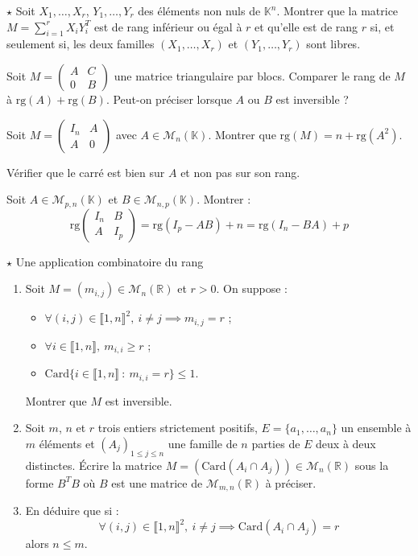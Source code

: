 \documentclass[french,a4paper]{article}
\newcommand{\R}{\mathbb{R}}
\newcommand{\K}{\mathbb{K}}
\newcommand{\card}{\text{Card}}
\theoremstyle{plain}
\theoremstyle{definition}
\theoremstyle{remark}
\begin{document}
\begin{ex}{$\star$}
	Soit $X_1,\ldots,X_r$, $Y_1,\ldots,Y_r$ des éléments non nuls de $\K^n$. Montrer que la matrice $M=\displaystyle\sum_{i=1}^{r}X_iY_i^T$ est de rang inférieur ou égal à $r$ et qu'elle est de rang $r$ si, et seulement si, les deux familles $(X_1,\ldots,X_r)$ et $(Y_1,\ldots,Y_r)$ sont libres.
\end{ex}

\begin{ex}{}
	Soit $M=\displaystyle\begin{pmatrix}
		A&C\\
		0&B
	\end{pmatrix}$ une matrice triangulaire par blocs. Comparer le rang de $M$ à $\text{rg}(A)+\text{rg}(B)$. Peut-on préciser lorsque $A$ ou $B$ est inversible ?
\end{ex}

\begin{ex}{}
		Soit $M=\displaystyle\begin{pmatrix}
		I_n&A\\
		A&0
	\end{pmatrix}$ avec $A\in\mathcal{M}_n(\K)$. Montrer que $\text{rg}(M)=n+\text{rg}(A^2)$.
\end{ex}
Vérifier que le carré est bien sur $A$ et non pas sur son rang.

\begin{ex}{}
	Soit $A\in\mathcal{M}_{p,n}(\K)$ et $B\in\mathcal{M}_{n,p}(\K)$. Montrer : $$\text{rg}\begin{pmatrix}
		I_n&B\\
		A&I_p
	\end{pmatrix}=\text{rg}(I_p-AB)+n=\text{rg}(I_n-BA)+p$$
\end{ex}

\begin{ex}{$\star$ Une application combinatoire du rang}
	\begin{enumerate}
		\item Soit $M=(m_{i,j})\in\mathcal{M}_n(\R)$ et $r>0$. On suppose :
		\begin{itemize}
			\item $\forall (i,j)\in\llbracket1,n\rrbracket^2,\ i\ne j\implies m_{i,j}=r$ ;
			\item $\forall i\in\llbracket1,n\rrbracket,\ m_{i,i}\geqslant r$ ;
			\item $\card\{i\in\llbracket1,n\rrbracket\ : \ m_{i,i}=r\}\leqslant 1$.
		\end{itemize} Montrer que $M$ est inversible.
		\item Soit $m$, $n$ et $r$ trois entiers strictement positifs, $E=\{a_1,\ldots,a_n\}$ un ensemble à $m$ éléments et $(A_j)_{1\leqslant j\leqslant n}$ une famille de $n$ parties de $E$ deux à deux distinctes. Écrire la matrice $M=(\card(A_i\cap A_j))\in\mathcal{M}_n(\R)$ sous la forme $B^TB$ où $B$ est une matrice de $\mathcal{M}_{m,n}(\R)$ à préciser.
		\item En déduire que si : $$\forall (i,j)\in\llbracket1,n\rrbracket^2,\ i\ne j\implies \card(A_i\cap A_j)=r$$ alors $n\leqslant m$.
	\end{enumerate}
\end{ex}
\end{document}

